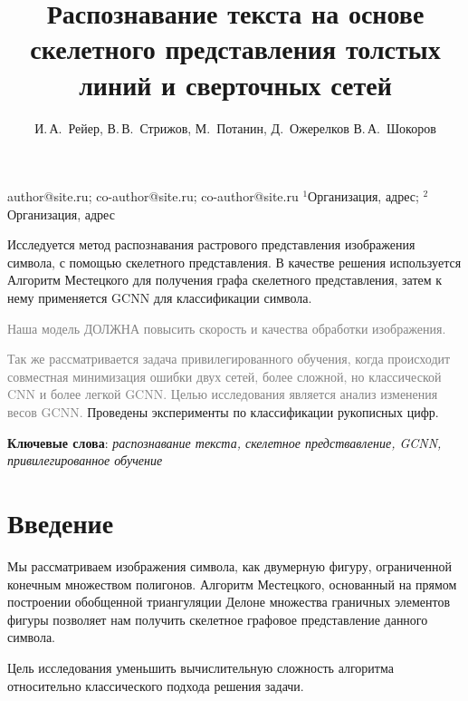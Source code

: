 \documentclass[12pt, twoside]{article}
\begin{document}
\title
    [Шаблон статьи для публикации] %
    {Распознавание текста на основе скелетного представления толстых линий и сверточных сетей}
\author
    { И.\,А.~Рейер, В.\,В.~Стрижов, М.~Потанин, Д.~Ожерелков В.\,А.~Шокоров} %

\email
    {author@site.ru; co-author@site.ru;  co-author@site.ru}
\organization
    {$^1$Организация, адрес; $^2$Организация, адрес}
\abstract
    {
    	Исследуется метод распознавания растрового представления изображения символа, с помощью скелетного представления. В качестве решения используется Алгоритм Местецкого для получения графа скелетного представления, затем к нему применяется GCNN для классификации символа. 
    	
    	\textcolor{gray}{Наша модель ДОЛЖНА повысить скорость и качества обработки изображения.}
    
        \textcolor{gray}{Так же рассматривается задача привилегированного обучения, когда происходит совместная минимизация ошибки двух сетей, более сложной, но классической CNN и более легкой GCNN. Целью исследования является анализ изменения весов GCNN.}
        Проведены эксперименты по классификации рукописных цифр.
    	
\bigskip
\noindent
\textbf{Ключевые слова}: \emph {распознавание текста, скелетное предствавление, GCNN, привилегированное обучение}
}



\maketitle


\section{Введение}

Мы рассматриваем изображения символа, как двумерную фигуру, ограниченной конечным множеством полигонов. Алгоритм Местецкого, основанный на прямом построении обобщенной триангуляции Делоне множества граничных элементов фигуры позволяет нам получить скелетное графовое представление данного символа.

Цель исследования уменьшить вычислительную сложность алгоритма относительно классического подхода решения задачи.
\end{document}
